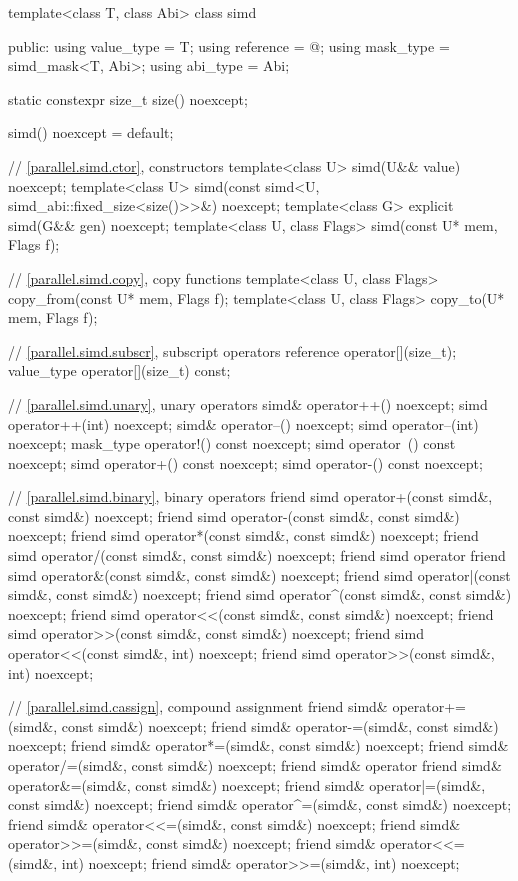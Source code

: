 \begin{codeblock}
template<class T, class Abi> class simd {
public:
  using value_type = T;
  using reference = @\seebelow@;
  using mask_type = simd_mask<T, Abi>;
  using abi_type = Abi;

  static constexpr size_t size() noexcept;

  simd() noexcept = default;

  // \ref{parallel.simd.ctor},  constructors
  template<class U> simd(U&& value) noexcept;
  template<class U> simd(const simd<U, simd_abi::fixed_size<size()>>&) noexcept;
  template<class G> explicit simd(G&& gen) noexcept;
  template<class U, class Flags> simd(const U* mem, Flags f);

  // \ref{parallel.simd.copy},  copy functions
  template<class U, class Flags> copy_from(const U* mem, Flags f);
  template<class U, class Flags> copy_to(U* mem, Flags f);

  // \ref{parallel.simd.subscr},  subscript operators
  reference operator[](size_t);
  value_type operator[](size_t) const;

  // \ref{parallel.simd.unary},  unary operators
  simd& operator++() noexcept;
  simd operator++(int) noexcept;
  simd& operator--() noexcept;
  simd operator--(int) noexcept;
  mask_type operator!() const noexcept;
  simd operator~() const noexcept;
  simd operator+() const noexcept;
  simd operator-() const noexcept;

  // \ref{parallel.simd.binary},  binary operators
  friend simd operator+(const simd&, const simd&) noexcept;
  friend simd operator-(const simd&, const simd&) noexcept;
  friend simd operator*(const simd&, const simd&) noexcept;
  friend simd operator/(const simd&, const simd&) noexcept;
  friend simd operator%
  friend simd operator&(const simd&, const simd&) noexcept;
  friend simd operator|(const simd&, const simd&) noexcept;
  friend simd operator^(const simd&, const simd&) noexcept;
  friend simd operator<<(const simd&, const simd&) noexcept;
  friend simd operator>>(const simd&, const simd&) noexcept;
  friend simd operator<<(const simd&, int) noexcept;
  friend simd operator>>(const simd&, int) noexcept;

  // \ref{parallel.simd.cassign},  compound assignment
  friend simd& operator+=(simd&, const simd&) noexcept;
  friend simd& operator-=(simd&, const simd&) noexcept;
  friend simd& operator*=(simd&, const simd&) noexcept;
  friend simd& operator/=(simd&, const simd&) noexcept;
  friend simd& operator%
  friend simd& operator&=(simd&, const simd&) noexcept;
  friend simd& operator|=(simd&, const simd&) noexcept;
  friend simd& operator^=(simd&, const simd&) noexcept;
  friend simd& operator<<=(simd&, const simd&) noexcept;
  friend simd& operator>>=(simd&, const simd&) noexcept;
  friend simd& operator<<=(simd&, int) noexcept;
  friend simd& operator>>=(simd&, int) noexcept;

}
\end{codeblock}
